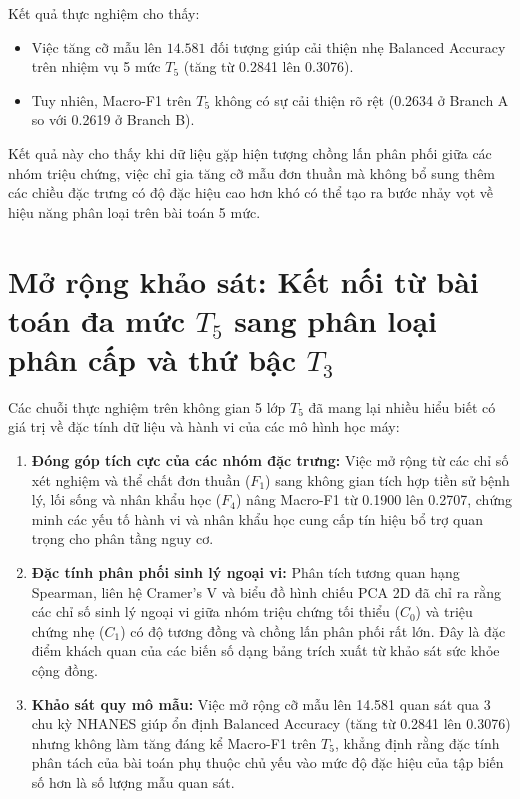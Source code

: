Kết quả thực nghiệm cho thấy:
\begin{itemize}
    \item Việc tăng cỡ mẫu lên $14.581$ đối tượng giúp cải thiện nhẹ Balanced Accuracy trên nhiệm vụ 5 mức $T_5$ (tăng từ 0.2841 lên 0.3076).
    \item Tuy nhiên, Macro-F1 trên $T_5$ không có sự cải thiện rõ rệt (0.2634 ở Branch A so với 0.2619 ở Branch B).
\end{itemize}
Kết quả này cho thấy khi dữ liệu gặp hiện tượng chồng lấn phân phối giữa các nhóm triệu chứng, việc chỉ gia tăng cỡ mẫu đơn thuần mà không bổ sung thêm các chiều đặc trưng có độ đặc hiệu cao hơn khó có thể tạo ra bước nhảy vọt về hiệu năng phân loại trên bài toán 5 mức.

\section{Mở rộng khảo sát: Kết nối từ bài toán đa mức $T_5$ sang phân loại phân cấp và thứ bậc $T_3$}
\label{sec:chuyen-dich-t5-t3}

Các chuỗi thực nghiệm trên không gian 5 lớp $T_5$ đã mang lại nhiều hiểu biết có giá trị về đặc tính dữ liệu và hành vi của các mô hình học máy:
\begin{enumerate}
    \item \textbf{Đóng góp tích cực của các nhóm đặc trưng:} Việc mở rộng từ các chỉ số xét nghiệm và thể chất đơn thuần ($F_1$) sang không gian tích hợp tiền sử bệnh lý, lối sống và nhân khẩu học ($F_4$) nâng Macro-F1 từ 0.1900 lên 0.2707, chứng minh các yếu tố hành vi và nhân khẩu học cung cấp tín hiệu bổ trợ quan trọng cho phân tầng nguy cơ.
    \item \textbf{Đặc tính phân phối sinh lý ngoại vi:} Phân tích tương quan hạng Spearman, liên hệ Cramer's V và biểu đồ hình chiếu PCA 2D đã chỉ ra rằng các chỉ số sinh lý ngoại vi giữa nhóm triệu chứng tối thiểu ($C_0$) và triệu chứng nhẹ ($C_1$) có độ tương đồng và chồng lấn phân phối rất lớn. Đây là đặc điểm khách quan của các biến số dạng bảng trích xuất từ khảo sát sức khỏe cộng đồng.
    \item \textbf{Khảo sát quy mô mẫu:} Việc mở rộng cỡ mẫu lên 14.581 quan sát qua 3 chu kỳ NHANES giúp ổn định Balanced Accuracy (tăng từ 0.2841 lên 0.3076) nhưng không làm tăng đáng kể Macro-F1 trên $T_5$, khẳng định rằng đặc tính phân tách của bài toán phụ thuộc chủ yếu vào mức độ đặc hiệu của tập biến số hơn là số lượng mẫu quan sát.
\end{enumerate}

